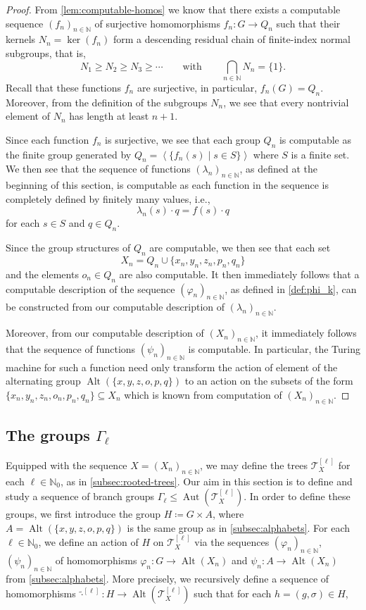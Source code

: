 \documentclass[a4paper]{amsart}
\renewcommand\leq\leqslant
\renewcommand\geq\geqslant
\numberwithin{equation}{section}
\theoremstyle{definition}
\theoremstyle{remark}
\newcommand{\N}{\mathbb{N}}
\DeclareMathOperator{\Alt}{Alt}
\DeclareMathOperator{\Aut}{Aut}
\newcommand{\T}{\mathcal{T}}
\begin{document}
\begin{proof}
From \cref{lem:computable-homos} we know that there exists a computable sequence $(f_n)_{n\in\N}$ of surjective homomorphisms $f_n\colon G\to Q_n$ such that their kernels $N_n=\ker(f_n)$ form a descending residual chain of finite-index normal subgroups, that is,
\[
    N_1\geq N_2 \geq N_3 \geq \cdots 
    \qquad
    \text{with}
    \qquad
    \bigcap_{n\in\N} N_n = \{1\}.
\]
Recall that these functions $f_n$ are surjective, in particular, $f_n(G)=Q_n$.
Moreover, from the definition of the subgroups $N_n$, we see that every nontrivial element of $N_n$ has length at least $n+1$.

Since each function $f_n$ is surjective, we see that each group $Q_n$ is computable as the finite group generated by $Q_n =\left\langle\{ f_n(s) \mid s \in S \}\right\rangle$ where $S$ is a finite set.
We then see that the sequence of functions $(\lambda_n)_{n\in \N}$, as defined at the beginning of this section, is computable as each function in the sequence is completely defined by finitely many values, i.e.,
\[
    \lambda_n(s)\cdot q = f(s)\cdot q
\]
for each $s\in S$ and $q\in Q_n$.

Since the group structures of $Q_n$ are computable, we then see that each set
\[
    X_n
    =
    Q_n \cup\{ x_n, y_n, z_n, p_n, q_n \}
\]
and the elements $o_n\in Q_n$ are also computable.
It then immediately follows that a computable description of the sequence $(\varphi_n)_{n\in\N}$, as defined in \eqref{def:phi_k}, can be constructed from our computable description of $(\lambda_n)_{n\in \N}$.

Moreover, from our computable description of $(X_n)_{n\in\N}$, it immediately follows that the sequence of functions $(\psi_n)_{n\in\N}$ is computable.
In particular, the Turing machine for such a function need only transform the action of element of the alternating group $\Alt(\{x,y,z,o,p,q\})$ to an action on the subsets of the form $\{ x_n, y_n, z_n, o_n, p_n, q_n\}\subseteq X_n$ which is known from computation of $(X_n)_{n\in \N}$.
\end{proof}

\subsection{The groups \texorpdfstring{$\Gamma_{\ell}$}{\$\textbackslash Gamma\_\textbackslash ell\$}}\label{sec:constructing-the-group-gamma}
Equipped with the sequence $X = (X_n)_{n\in\N}$, we may define the trees $\T_X^{[\ell]}$ for each $\ell\in \N_0$, as in \cref{subsec:rooted-trees}.
Our aim in this section is to define and study a sequence of branch groups $\Gamma_\ell \leq \Aut(\T_X^{[\ell]})$.
In order to define these groups, we first introduce the group $H \coloneqq G \times A$, where $A = \Alt(\{x,y,z,o,p,q\})$ is the same group as in \cref{subsec:alphabets}.
For each $\ell\in\N_0$, we define an action of $H$ on $\T_X^{[\ell]}$ via the sequences $(\varphi_n)_{n\in\N}$, $(\psi_n)_{n\in\N}$ of homomorphisms $\varphi_n\colon G\to \Alt(X_n)$ and $\psi_n\colon A\to \Alt(X_n)$ from \cref{subsec:alphabets}.
More precisely, we recursively define a sequence of homomorphisms $\widetilde{\cdot}^{[\ell]}\colon H \to \Alt(\T_X^{[\ell]})$ such that for each $h=(g,\sigma)\in H$,
\end{document}

